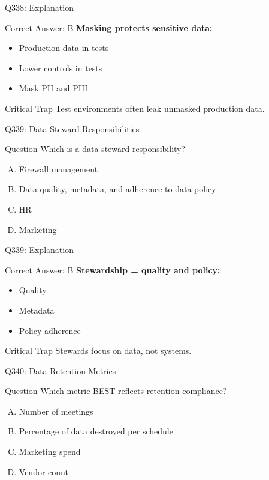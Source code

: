 \documentclass{beamer}
\begin{document}
	\begin{frame}{Q338: Explanation}
		\begin{block}{Correct Answer: B}
			\textbf{Masking protects sensitive data:}
			\begin{itemize}
				\item Production data in tests
				\item Lower controls in tests
				\item Mask PII and PHI
			\end{itemize}
		\end{block}
		\begin{alertblock}{Critical Trap}
			Test environments often leak unmasked production data.
		\end{alertblock}
	\end{frame}
	
	\begin{frame}{Q339: Data Steward Responsibilities}
		\begin{block}{Question}
			Which is a data steward responsibility?
		\end{block}
		\begin{enumerate}[(A)]
			\item Firewall management
			\item Data quality, metadata, and adherence to data policy
			\item HR
			\item Marketing
		\end{enumerate}
	\end{frame}
	
	\begin{frame}{Q339: Explanation}
		\begin{block}{Correct Answer: B}
			\textbf{Stewardship = quality and policy:}
			\begin{itemize}
				\item Quality
				\item Metadata
				\item Policy adherence
			\end{itemize}
		\end{block}
		\begin{alertblock}{Critical Trap}
			Stewards focus on data, not systems.
		\end{alertblock}
	\end{frame}
	
	\begin{frame}{Q340: Data Retention Metrics}
		\begin{block}{Question}
			Which metric BEST reflects retention compliance?
		\end{block}
		\begin{enumerate}[(A)]
			\item Number of meetings
			\item Percentage of data destroyed per schedule
			\item Marketing spend
			\item Vendor count
		\end{enumerate}
	\end{frame}
	
\end{document}
